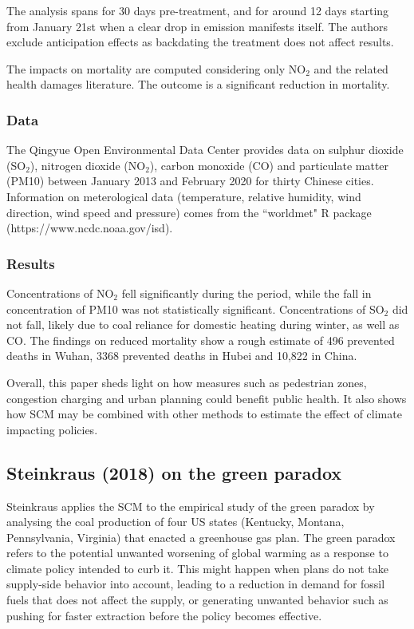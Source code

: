 \documentclass[12pt,a4paper,draft]{article}
\begin{document}
The analysis spans for 30 days pre-treatment, and for around 12 days starting from 
January 21st when a clear drop in emission manifests itself. 
The authors exclude anticipation effects as backdating the treatment does not affect 
results. 

The impacts on mortality are computed considering only NO$_2$ and the related health 
damages literature. The outcome is a significant reduction in mortality. 


\subsubsection*{Data}
The Qingyue Open Environmental Data Center provides data on sulphur dioxide (SO$_2$), 
nitrogen dioxide (NO$_2$), carbon monoxide (CO) and particulate matter (PM10) between 
January 2013 and February 2020 for thirty Chinese cities. Information on 
meterological data (temperature, relative humidity, wind direction, wind speed and 
pressure) comes from the ``worldmet" R package (https://www.ncdc.noaa.gov/isd).

\subsubsection*{Results}
Concentrations of NO$_2$ fell significantly during the period, while the fall in 
concentration of PM10 was not statistically significant. Concentrations of SO$_2$ 
did not fall, likely due to coal reliance for domestic heating during 
winter, as well as CO. 
The findings on reduced mortality show a rough estimate of 496 prevented deaths in 
Wuhan, 3368 prevented deaths in Hubei and 10,822 in China.

Overall, this paper sheds light on how measures such as pedestrian zones, congestion 
charging and urban planning could benefit public health. It also shows how SCM may 
be combined with other methods to estimate the effect of climate impacting policies.


\subsection{Steinkraus (2018) on the green paradox}
Steinkraus applies the SCM to the empirical study of the green paradox by analysing the coal 
production of four US states (Kentucky, Montana, Pennsylvania, Virginia) that enacted a 
greenhouse gas plan. 
The green paradox refers to the potential unwanted worsening of global warming as a 
response to climate policy intended to curb it. 
This might happen when plans do not take supply-side behavior into 
account, leading to a reduction in demand for fossil fuels that does not affect the supply, 
or generating unwanted behavior such as pushing for faster extraction before the policy 
becomes effective. 
\end{document}
